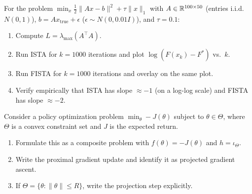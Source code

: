 \documentclass[11pt,a4paper]{article}
\begin{document}
\begin{exercise}\label{ex:fista-vs-ista}
For the problem $\min_x \frac{1}{2}\|Ax - b\|^2 + \tau\|x\|_1$ with
$A \in \mathbb{R}^{100 \times 50}$ (entries i.i.d.\ $N(0,1)$),
$b = Ax_{\text{true}} + \epsilon$ ($\epsilon \sim N(0, 0.01 I)$),
and $\tau = 0.1$:
\begin{enumerate}[label=(\alph*)]
  \item Compute $L = \lambda_{\max}(A^\top A)$.
  \item Run ISTA for $k = 1000$ iterations and plot
    $\log(F(x_k) - F^*)$ vs.\ $k$.
  \item Run FISTA for $k = 1000$ iterations and overlay on the same
    plot.
  \item Verify empirically that ISTA has slope $\approx -1$ (on a
    log-log scale) and FISTA has slope $\approx -2$.
\end{enumerate}
\end{exercise}

\begin{exercise}%
\label{ex:constrained-rl}
Consider a policy optimization problem
$\min_\theta -J(\theta)$ subject to $\theta \in \Theta$, where
$\Theta$ is a convex constraint set and $J$ is the expected return.
\begin{enumerate}[label=(\alph*)]
  \item Formulate this as a composite problem with
    $f(\theta) = -J(\theta)$ and $h = \iota_\Theta$.
  \item Write the proximal gradient update and identify it as
    projected gradient ascent.
  \item If $\Theta = \{\theta : \|\theta\| \le R\}$, write the
    projection step explicitly.
\end{enumerate}
\end{exercise}


\end{document}
